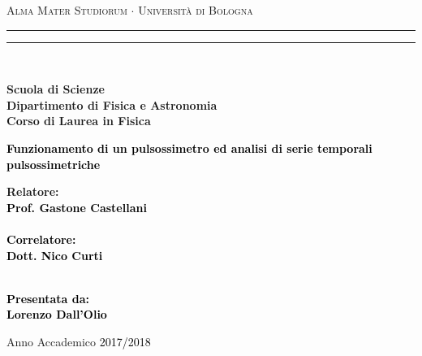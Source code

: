 \documentclass[12pt,a4paper, twoside, openright]{report}
\begin{document}

\raggedbottom
\frenchspacing

\begin{titlepage}
%
%
%
%
%
\begin{center}
{{\Large{\textsc{Alma Mater Studiorum $\cdot$ Universit\`a di Bologna}}}} 
\rule[0.1cm]{15.8cm}{0.1mm}
\rule[0.5cm]{15.8cm}{0.6mm}
\\\vspace{3mm}

{\small{\bf Scuola di Scienze \\ 
Dipartimento di Fisica e Astronomia\\
Corso di Laurea in Fisica}}

\end{center}

\vspace{23mm}

\begin{center}\textcolor{black}{
%
%
{\LARGE{\bf Funzionamento di un pulsossimetro ed analisi di serie temporali pulsossimetriche}}\\
}\end{center}

\vspace{50mm} \par \noindent

\begin{minipage}[t]{0.47\textwidth}
%
%
{\large{\bf Relatore: \vspace{2mm}\\\textcolor{black}{
Prof. Gastone Castellani}\\\\
%
%
%
%
\textcolor{black}{
\bf Correlatore:
\vspace{2mm}\\
Dott. Nico Curti\\\\}}}
\end{minipage}
%
\hfill
%
\begin{minipage}[t]{0.47\textwidth}\raggedleft \textcolor{black}{
{\large{\bf Presentata da:
\vspace{2mm}\\
%
%
Lorenzo Dall'Olio}}}
\end{minipage}

\vspace{40mm}

\begin{center}
%
%
Anno Accademico \textcolor{black}{ 2017/2018}
\end{center}

\end{titlepage}
\end{document}
